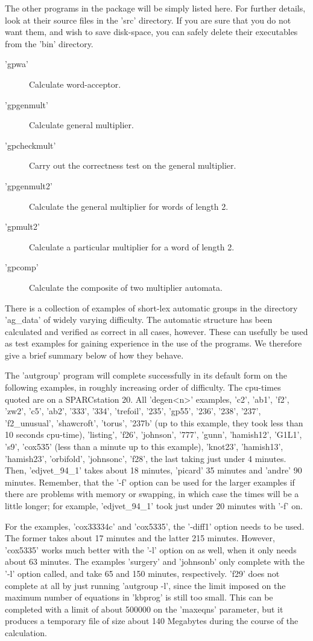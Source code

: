 The other programs in the package will be simply listed here. For
further details, look at their source files in the 'src' directory.
If you are sure that you do not want them, and wish to save disk-space,
you can safely delete their executables from the 'bin' directory.
\begin{description}
\item['gpwa'] Calculate word-acceptor.
\item['gpgenmult'] Calculate general multiplier.
\item['gpcheckmult'] Carry out the correctness test on the general multiplier.
\item['gpgenmult2'] Calculate the general multiplier for words of length 2.
\item['gpmult2'] Calculate a particular multiplier for a word of length 2.
\item['gpcomp'] Calculate the composite of two multiplier automata.
\end{description}


There is a collection of examples of short-lex automatic groups in the
directory 'ag\_data' of widely varying difficulty. The automatic structure
has been calculated and verified as correct in all cases, however.
These can usefully be used as test examples for gaining experience in the
use of the programs. We therefore give a brief summary below of how
they behave.

The 'autgroup' program will complete successfully in its default form on the
following examples, in roughly increasing order of difficulty.
The cpu-times quoted are on a SPARCstation 20.
All 'degen<n>' examples, 'c2', 'ab1', 'f2', 'zw2', 'c5', 'ab2', '333',
'334', 'trefoil', '235', 'gp55', '236', '238', '237', 'f2\_unusual',
'shawcroft', 'torus', '237b' (up to this example, they took less than
10 seconds cpu-time), 'listing', 'f26',
'johnson', '777', 'gunn', 'hamish12', 'G1L1', 's9', 'cox535' (less than
a minute up to this example), 'knot23', 'hamish13', 'hamish23',
'orbifold', 'johnsonc', 'f28', the last taking just under 4 minutes. 
Then, 'edjvet\_94\_1' takes about 18 minutes, 'picard' 35 minutes and 'andre'
90 minutes.  Remember, that the '-f' option can be used for the larger
examples if there are problems with memory or swapping, in which case
the times will be a little longer; for example, 'edjvet\_94\_1' took just under
20 minutes with '-f' on.

For the examples, 'cox33334c' and 'cox5335', the '-diff1' option needs
to be used. The former takes about 17 minutes and the latter 215 minutes.
However, 'cox5335' works much better with the '-l' option on as well, when
it only needs about 63 minutes. The examples 'surgery' and 'johnsonb'
only complete with the '-l' option called, and take 65 and 150 minutes,
respectively. 'f29' does not complete at all by just running 'autgroup -l',
since the limit imposed on the maximum number of equations in 'kbprog' is
still too small. This can be completed with a limit of about 500000 on
the 'maxeqns' parameter, but it produces a temporary file of size about 140
Megabytes during the course of the calculation.
